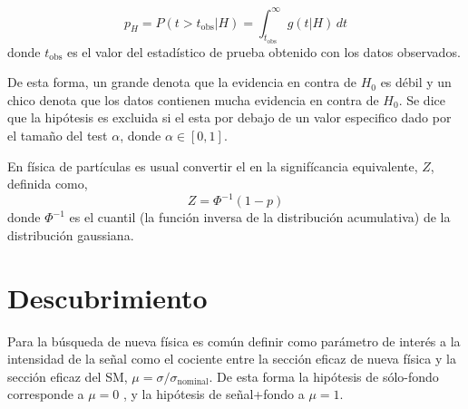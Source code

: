 \begin{equation}
  p_H = P(t>t_\text{obs}|H) = \int_{t_\text{obs}}^{\infty} g(t|H) \, dt
\end{equation}
%
donde $t_\text{obs}$ es el valor del estadístico de prueba obtenido con los
datos observados.

De esta forma, un {\pvalue} grande denota que la evidencia en contra de $H_0$ es
débil y un {\pvalue} chico denota que los datos contienen mucha evidencia en
contra de $H_0$.
Se dice que la hipótesis es excluida si el {\pvalue} esta por debajo de un valor
especifico dado por el tama\~no del test $\alpha$, donde $\alpha \in [0,1]$.

En física de partículas es usual convertir el {\pvalue} en la signifícancia
equivalente, $Z$, definida como,
\begin{equation}
  Z = \Phi^{-1}(1-p)
\end{equation}
%
donde $\Phi^{-1}$ es el cuantil (la función inversa de la distribución
acumulativa) de la distribución gaussiana.





\section{Descubrimiento}

Para la búsqueda de nueva física es común definir como parámetro de interés a la
intensidad de la señal como el cociente entre la sección eficaz de nueva física
y la sección eficaz del SM, $\mu = \sigma/\sigma_\text{nominal}$.
De esta forma la hipótesis de sólo-fondo corresponde a $\mu = 0$ , y
la hipótesis de señal+fondo a $\mu = 1$.

